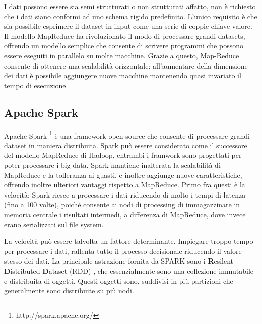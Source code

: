 I dati possono essere sia semi strutturati o non strutturati affatto, non è richiesto che i dati siano conformi ad uno schema rigido predefinito. L'unico requisito è che sia possibile esprimere il dataset in input come una serie di coppie chiave valore.
Il modello MapReduce ha rivoluzionato il modo di processare grandi datasets, offrendo un modello semplice che consente di scrivere programmi che possono essere eseguiti in parallelo su molte macchine. Grazie a questo, Map-Reduce consente di ottenere una scalabilità orizzontale: all'aumentare della dimensione dei dati è possibile aggiungere nuove macchine mantenendo quasi invariato il tempo di esecuzione.
\subsection{Apache Spark}






Apache Spark \footnote{http://spark.apache.org/} è una framework open-source che consente di processare grandi dataset in maniera distribuita.
Spark può essere considerato come il successore del modello MapReduce di Hadoop, entrambi i framwork sono progettati per poter processare i big data.  Spark mantiene inalterata la scalabilità di MapReduce e la tolleranza ai guasti, e inoltre aggiunge nuove caratteristiche, offrendo inoltre ulteriori vantaggi rispetto a MapReduce. Primo fra questi è la velocità: Spark riesce a processare i dati riducendo  di molto i tempi di latenza (fino a 100 volte), poiché  consente ai nodi di processing di immagazzinare in memoria centrale i risultati intermedi, a differenza di MapReduce, dove invece erano serializzati sul file system.  



La velocità può essere talvolta un fattore determinante. Impiegare troppo tempo per processare i dati, rallenta tutto il processo decisionale riducendo il valore stesso dei dati.
La principale astrazione fornita da SPARK sono i \textbf{R}esilent \textbf{D}istributed \textbf{D}ataset (RDD) \cite{Zaharia:2012:RDD:2228298.2228301}, che essenzialmente sono una collezione immutabile e distribuita di oggetti. Questi oggetti sono, suddivisi in più partizioni che  generalmente sono distribuite su più nodi.

